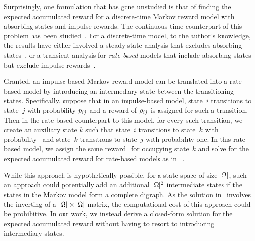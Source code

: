 Surprisingly, one formulation that has gone unstudied is that of finding the expected accumulated reward for a discrete-time Markov reward model with absorbing states and impulse rewards.  The continuous-time counterpart of this problem has been studied~\cite{Trivedi93}.  For a discrete-time model, to the author's knowledge, the results have either involved a steady-state analysis that excludes absorbing states~\cite{howard1971dynamicv2}, or a transient analysis for \emph{rate-based} models that include absorbing states but exclude impulse rewards~\cite{howard1971dynamicv2}.  


Granted, an impulse-based Markov reward model can be translated into a rate-based model by introducing an intermediary state between the transitioning states.  Specifically, suppose that in an impulse-based model, state~$i$ transitions to state~$j$ with probability $p_{ij}$ and a reward of $\rho_{ij}$ is assigned for such a transition.  Then in the rate-based counterpart to this model, for every such transition, we create an auxiliary state $k$ such that state~$i$ transitions to state~$k$ with probability~ and state~$k$ transitions to state~$j$ with probability one.  In this rate-based model, we assign the same reward~ for occupying state~$k$ and solve for the expected accumulated reward for rate-based models as in~\cite{howard1971dynamicv2} .  %

While this approach is hypothetically possible, for a state space of size $|\Omega|$, such an approach could potentially add an additional $|\Omega|^2$ intermediate states if the states in the Markov model form a complete digraph.  As the solution in~\cite{howard1971dynamicv2} involves the inverting of a $|\Omega| \times |\Omega|$ matrix, the computational cost of this approach could be prohibitive.  In our work, we instead derive a closed-form solution for the expected accumulated reward without having to resort to introducing intermediary states.



